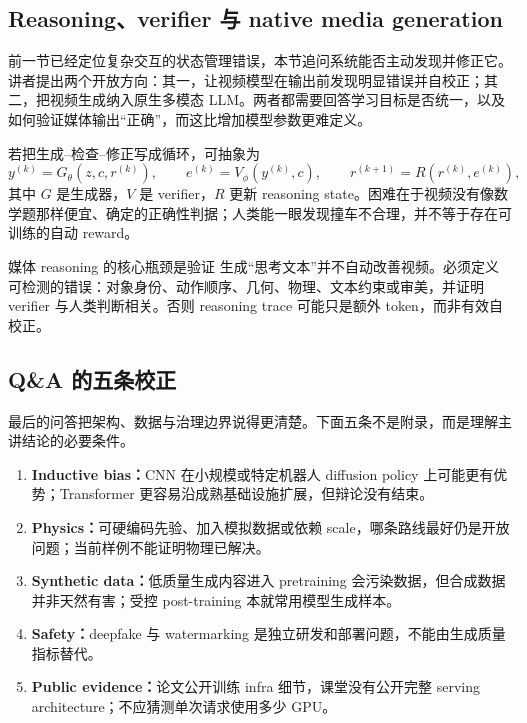 \subsection{Reasoning、verifier 与 native media generation}

前一节已经定位复杂交互的状态管理错误，本节追问系统能否主动发现并修正它。讲者提出两个开放方向：其一，让视频模型在输出前发现明显错误并自校正；其二，把视频生成纳入原生多模态 LLM。两者都需要回答学习目标是否统一，以及如何验证媒体输出“正确”，而这比增加模型参数更难定义。


若把生成--检查--修正写成循环，可抽象为
\[
y^{(k)}=G_\theta(z,c,r^{(k)}),\qquad
e^{(k)}=V_\phi(y^{(k)},c),\qquad
r^{(k+1)}=R(r^{(k)},e^{(k)}),
\]
其中 $G$ 是生成器，$V$ 是 verifier，$R$ 更新 reasoning state。困难在于视频没有像数学题那样便宜、确定的正确性判据；人类能一眼发现撞车不合理，并不等于存在可训练的自动 reward。

\begin{importantbox}{媒体 reasoning 的核心瓶颈是验证}
生成“思考文本”并不自动改善视频。必须定义可检测的错误：对象身份、动作顺序、几何、物理、文本约束或审美，并证明 verifier 与人类判断相关。否则 reasoning trace 可能只是额外 token，而非有效自校正。
\end{importantbox}

\subsection{Q\&A 的五条校正}

最后的问答把架构、数据与治理边界说得更清楚。下面五条不是附录，而是理解主讲结论的必要条件。

\begin{enumerate}
  \item \textbf{Inductive bias：}CNN 在小规模或特定机器人 diffusion policy 上可能更有优势；Transformer 更容易沿成熟基础设施扩展，但辩论没有结束。
  \item \textbf{Physics：}可硬编码先验、加入模拟数据或依赖 scale，哪条路线最好仍是开放问题；当前样例不能证明物理已解决。
  \item \textbf{Synthetic data：}低质量生成内容进入 pretraining 会污染数据，但合成数据并非天然有害；受控 post-training 本就常用模型生成样本。
  \item \textbf{Safety：}deepfake 与 watermarking 是独立研发和部署问题，不能由生成质量指标替代。
  \item \textbf{Public evidence：}论文公开训练 infra 细节，课堂没有公开完整 serving architecture；不应猜测单次请求使用多少 GPU。
\end{enumerate}

